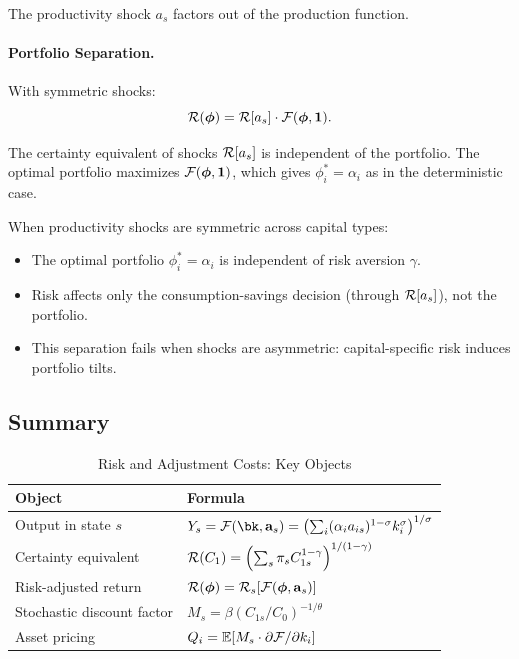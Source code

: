 The productivity shock $a_s$ factors out of the production function.

\paragraph{Portfolio Separation.}
With symmetric shocks:
\begin{equation}
\mathcal{R}(\boldsymbol{\phi}) = \mathcal{R}[a_s] \cdot \mathcal{F}(\boldsymbol{\phi}, \mathbf{1}).
\label{eq:ac-risk-R-symmetric}
\end{equation}

The certainty equivalent of shocks $\mathcal{R}[a_s]$ is independent of the portfolio. The optimal portfolio maximizes $\mathcal{F}(\boldsymbol{\phi}, \mathbf{1})$, which gives $\phi_i^* = \alpha_i$ as in the deterministic case.

\begin{callouttip}
When productivity shocks are symmetric across capital types:
\begin{itemize}[nosep]
\item The optimal portfolio $\phi_i^* = \alpha_i$ is independent of risk aversion $\gamma$.
\item Risk affects only the consumption-savings decision (through $\mathcal{R}[a_s]$), not the portfolio.
\item This separation fails when shocks are asymmetric: capital-specific risk induces portfolio tilts.
\end{itemize}
\end{callouttip}

\subsection{Summary}
\label{subsec:ac-risk-summary}

\begin{table}[H]
\centering
\caption{Risk and Adjustment Costs: Key Objects}
\label{tab:ac-risk-summary}
\renewcommand{\arraystretch}{1.6}
\begin{tabular}{@{}ll@{}}
\toprule
\textbf{Object} & \textbf{Formula} \\
\midrule
Output in state $s$ & $Y_s = \F(\bk, \ba_s) = \left( \sum_i (\alpha_i a_{is})^{1-\sigma} k_i^{\sigma} \right)^{1/\sigma}$ \\[6pt]
Certainty equivalent & $\mathcal{R}(C_1) = \left( \sum_s \pi_s C_{1s}^{1-\gamma} \right)^{1/(1-\gamma)}$ \\[6pt]
Risk-adjusted return & $\mathcal{R}(\boldsymbol{\phi}) = \mathcal{R}_s[\mathcal{F}(\boldsymbol{\phi}, \mathbf{a}_s)]$ \\[6pt]
Stochastic discount factor & $M_s = \beta (C_{1s}/C_0)^{-1/\theta}$ \\[6pt]
Asset pricing & $Q_i = \mathbb{E}[M_s \cdot \partial \mathcal{F} / \partial k_i]$ \\[6pt]
\bottomrule
\end{tabular}
\end{table}


